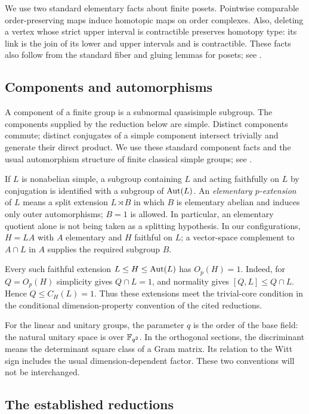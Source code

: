 We use two standard elementary facts about finite posets. Pointwise
comparable order-preserving maps induce homotopic maps on order
complexes. Also, deleting a vertex whose strict upper interval is
contractible preserves homotopy type: its link is the join of its lower
and upper intervals and is contractible. These facts also follow from
the standard fiber and gluing lemmas for posets; see
\citet{Quillen1978,PitermanSmith2025}.

\subsection{Components and automorphisms}
A component of a finite group is a subnormal quasisimple subgroup.
The components supplied by the reduction below are simple. Distinct
components commute; distinct conjugates of a simple component intersect
trivially and generate their direct product. We use these standard
component facts and the usual automorphism structure of finite
classical simple groups; see \citet{GLS1998}.

If $L$ is nonabelian simple, a subgroup containing $L$ and acting
faithfully on $L$ by conjugation is identified with a subgroup of
$\operatorname{Aut}(L)$. An \emph{elementary $p$-extension} of $L$ means a split
extension $L\rtimes B$ in which $B$ is elementary abelian and induces
only outer automorphisms; $B=1$ is allowed. In particular, an elementary
quotient alone is not being taken as a splitting hypothesis. In our
configurations, $H=LA$ with $A$ elementary and $H$ faithful on $L$; a
vector-space complement to $A\cap L$ in $A$ supplies the required
subgroup $B$.

Every such faithful extension $L\le H\le\operatorname{Aut}(L)$ has $O_p(H)=1$.
Indeed, for $Q=O_p(H)$ simplicity gives $Q\cap L=1$, and normality
gives $[Q,L]\le Q\cap L$. Hence $Q\le C_H(L)=1$.
Thus these extensions meet the trivial-core condition in the
conditional dimension-property convention of the cited reductions.

For the linear and unitary groups, the parameter $q$ is the order of
the base field: the natural unitary space is over $\mathbb F_{q^2}$. In the
orthogonal sections, the discriminant means the determinant square
class of a Gram matrix. Its relation to the Witt sign includes the
usual dimension-dependent factor. These two conventions will not be
interchanged.

\subsection{The established reductions}

